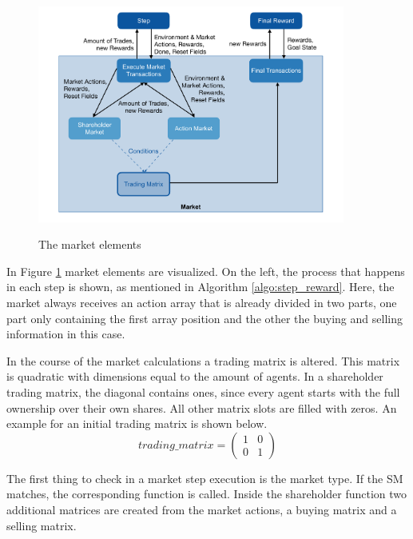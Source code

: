 \begin{figure}[hpbt]
    \centering
    \includegraphics[width=0.9\textwidth]{pictures/market}\\
    \caption[Market Elements]{The market elements}\label{fig:market}
\end{figure}

In Figure \ref{fig:market} market elements are visualized. On the left, the process that happens in each step is shown, as mentioned in Algorithm \ref{algo:step_reward}. Here, the market always receives an action array that is already divided in two parts, one part only containing the first array position and the other the buying and selling information in this case.

In the course of the market calculations a trading matrix is altered. This matrix is quadratic with dimensions equal to the amount of agents. In a shareholder trading matrix, the diagonal contains ones, since every agent starts with the full ownership over their own shares. All other matrix slots are filled with zeros. An example for an initial trading matrix is shown below.
\begin{equation*}
trading\_matrix = 
\begin{pmatrix}
1 & 0 \\
0 & 1
\end{pmatrix}
\end{equation*}

The first thing to check in a market step execution is the market type. If the SM matches, the corresponding function is called. 
Inside the shareholder function two additional matrices are created from the market actions, a buying matrix and a selling matrix.

